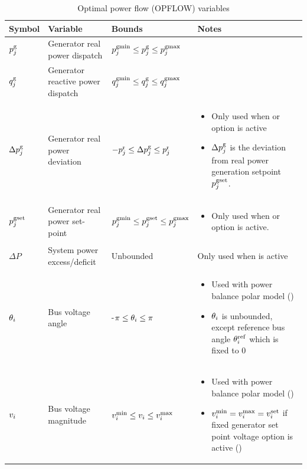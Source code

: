 \begin{table}[!htbp]
\caption{Optimal power flow (OPFLOW) variables}
\small
  \begin{tabular}{|p{}|p{}|p{}|p{}|}
   \hline
    \textbf{Symbol} & \textbf{Variable} & \textbf{Bounds} & \textbf{Notes} \\
    \hline
    $p^\mathrm{g}_j$ & Generator real power dispatch & $p^\mathrm{gmin}_j \le p^\mathrm{g}_j \le p^\mathrm{gmax}_j$ & ~\\
    \hline
    $q^\mathrm{g}_j$ & Generator reactive power dispatch & $q^\mathrm{gmin}_j \le q^\mathrm{g}_j \le q^\mathrm{gmax}_j$ & ~ \\
    \hline
    $\Delta{p}^\mathrm{g}_j$ & Generator real power deviation & $-p^{\text{r}}_j \le \Delta{p}^\mathrm{g}_j \le p^{\text{r}}_j$ & \begin{itemize}[noitemsep,topsep=0pt,leftmargin=*]  \item Only used when \option{\opflowgensetpoint} or \option{\opflowuseagc} option is active \item $\Delta{p}^\mathrm{g}_j$ is the deviation from real power generation setpoint $p^{\mathrm{gset}}_j$.\end{itemize} \\
    \hline
    $p^{\mathrm{gset}}_j$ & Generator real power set-point & $p^\mathrm{gmin}_j \le p^{\mathrm{gset}}_j \le p^\mathrm{gmax}_j$ & \begin{itemize}[noitemsep,topsep=0pt,leftmargin=*] \item Only used when \option{\opflowgensetpoint} or \option{\opflowuseagc} option is active. \end{itemize} \\
    \hline
    $\Delta{P}$ & System power excess/deficit & Unbounded & Only used when \option{\opflowuseagc} is active \\
    \hline
    $\theta_i$ & Bus voltage angle & -$\pi \le \theta_i \le \pi$ & 
    \begin{itemize}[noitemsep,topsep=0pt,leftmargin=*] 
        \item Used with power balance polar model (\option{\opflowmodel~\pbpol}) 
        \item $\theta_i$ is unbounded, except reference bus angle $\theta^\mathrm{ref}_i$ which is fixed to 0 
    \end{itemize} \\
    \hline
    $v_i$ & Bus voltage magnitude & $v^\mathrm{min}_i \le v_i \le v^\mathrm{max}_i$ & \begin{itemize}[noitemsep,topsep=0pt,leftmargin=*] \item Used with power balance polar model (\option{\opflowmodel~\pbpol})\item $v^\mathrm{min}_i = v^\mathrm{max}_i = v^\mathrm{set}_i$ if fixed generator set point voltage option is active (\option{\opflowgensetpoint}) \end{itemize} \\

\end{tabular}
\end{table}
